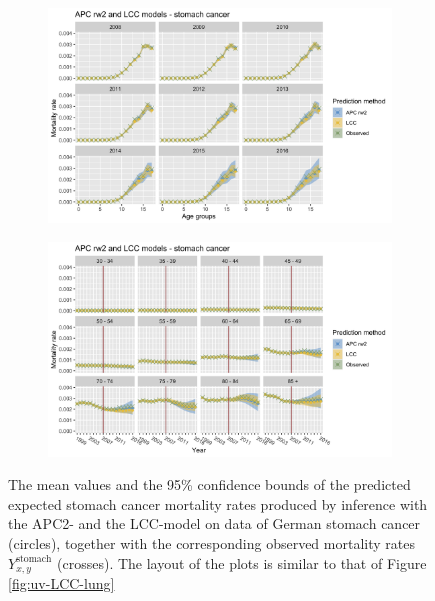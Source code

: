 \begin{figure}[h!]
    \centering
    \begin{subfigure}[b]{.6\linewidth}
        \includegraphics[width=\linewidth]{real-data/real-data-univariate/Figures/univariate-comparison-by-age-stomach.png}
        \label{fig:uv-comparison-stomach-top}
    \end{subfigure}
    
    \begin{subfigure}[b]{.6\linewidth}
        \includegraphics[width=\linewidth]{real-data/real-data-univariate/Figures/univariate-comparison-by-period-stomach.png}
        \label{fig:uv-comparison-stomach-bottom}
    \end{subfigure}
    \caption{The mean values and the 95\% confidence bounds of the predicted expected stomach cancer mortality rates produced by inference with the APC2- and the LCC-model on data of German stomach cancer (circles), together with the corresponding observed mortality rates $Y_{x,y}^{\text{stomach}}$ (crosses). The layout of the plots is similar to that of Figure \ref{fig:uv-LCC-lung}}
    \label{fig:uv-comparison-stomach}
\end{figure}

